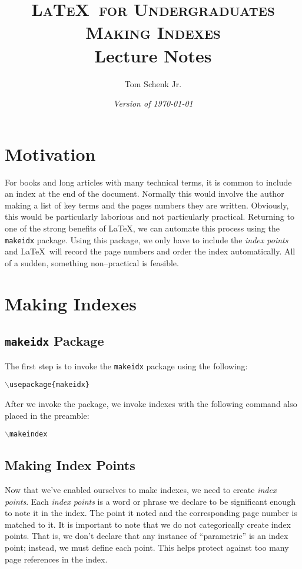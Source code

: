 \documentclass{article}
\title{\textsc{\LaTeX\ for Undergraduates\\
			Making Indexes} \\
			Lecture Notes}
\author{Tom Schenk Jr.}		%
\date{\textit{Version of \today}}
\begin{document}
\maketitle

\section{Motivation}

For books and long articles with many technical terms, it is common to include an index at the end of the document. Normally this would involve the author making a list of key terms and the pages numbers they are written. Obviously, this would be particularly laborious and not particularly practical. Returning to one of the strong benefits of \LaTeX, we can automate this process using the \texttt{makeidx} package. Using this package, we only have to include the \textit{index points} and \LaTeX\ will record the page numbers and order the index automatically. All of a sudden, something non--practical is feasible.

\section{Making Indexes}

\subsection{\texttt{makeidx} Package}

The first step is to invoke the \texttt{makeidx} package using the following:
\begin{center}
\texttt{$\backslash$usepackage\{makeidx\}}
\end{center}

After we invoke the package, we invoke indexes with the following command also placed in the preamble:
\begin{center}
\texttt{$\backslash$makeindex}
\end{center}

\subsection{Making Index Points}

Now that we've enabled ourselves to make indexes, we need to create \textit{index points}. Each \textit{index points} is a word or phrase we declare to be significant enough to note it in the index. The point it noted and the corresponding page number is matched to it. It is important to note that we do not categorically create index points. That is, we don't declare that any instance of ``parametric'' is an index point; instead, we must define each point. This helps protect against too many page references in the index.
\end{document}
